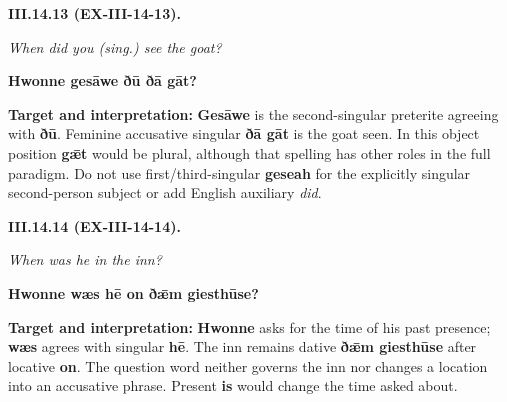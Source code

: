 \par\begin{minipage}{\linewidth}\raggedright
\textbf{III.14.13 (EX-III-14-13).}

\emph{When did you (sing.) see the goat?}

\textbf{Hwonne gesāwe ðū ðā gāt?}

\textbf{Target and interpretation:} \textbf{Gesāwe} is the second-singular preterite agreeing with \textbf{ðū}. Feminine accusative singular \textbf{ðā gāt} is the goat seen. In this object position \textbf{gǣt} would be plural, although that spelling has other roles in the full paradigm. Do not use first/\allowbreak{}third-singular \textbf{geseah} for the explicitly singular second-person subject or add English auxiliary \emph{did}.

\end{minipage}\par\addvspace{4pt}

\par\begin{minipage}{\linewidth}\raggedright
\textbf{III.14.14 (EX-III-14-14).}

\emph{When was he in the inn?}

\textbf{Hwonne wæs hē on ðǣm giesthūse?}

\textbf{Target and interpretation:} \textbf{Hwonne} asks for the time of his past presence; \textbf{wæs} agrees with singular \textbf{hē}. The inn remains dative \textbf{ðǣm giesthūse} after locative \textbf{on}. The question word neither governs the inn nor changes a location into an accusative phrase. Present \textbf{is} would change the time asked about.

\end{minipage}\par\addvspace{4pt}

